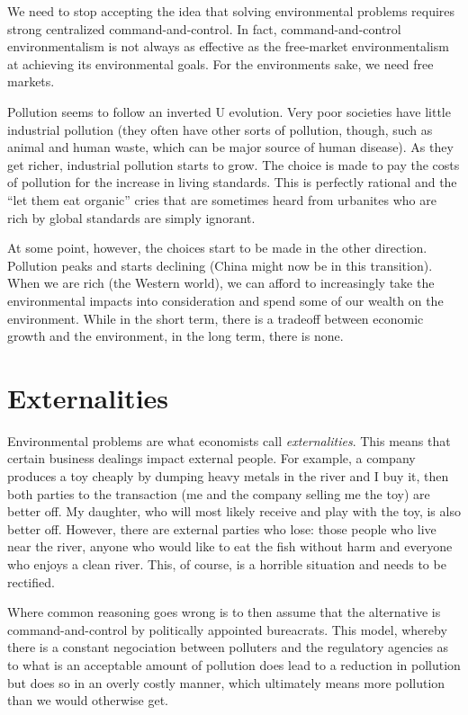 We need to stop accepting the idea that solving environmental problems requires
strong centralized command-and-control. In fact, command-and-control
environmentalism is not always as effective as the free-market environmentalism
at achieving its environmental goals. For the environments sake, we need free
markets.

Pollution seems to follow an inverted U evolution. Very poor societies have
little industrial pollution (they often have other sorts of pollution, though,
such as animal and human waste, which can be major source of human disease). As
they get richer, industrial pollution starts to grow. The choice is made to pay
the costs of pollution for the increase in living standards. This is perfectly
rational and the ``let them eat organic'' cries that are sometimes heard from
urbanites who are rich by global standards are simply ignorant.

At some point, however, the choices start to be made in the other direction.
Pollution peaks and starts declining (China might now be in this transition).
When we are rich (the Western world), we can afford to increasingly take the
environmental impacts into consideration and spend some of our wealth on the
environment.  While in the short term, there is a tradeoff between economic
growth and the environment, in the long term, there is none.

\section{Externalities}

Environmental problems are what economists call \emph{externalities}. This
means that certain business dealings impact external people. For example, a
company produces a toy cheaply by dumping heavy metals in the river and I buy
it, then both parties to the transaction (me and the company selling me the
toy) are better off. My daughter, who will most likely receive and play with
the toy, is also better off. However, there are external parties who lose:
those people who live near the river, anyone who would like to eat the fish
without harm and everyone who enjoys a clean river. This, of course, is a
horrible situation and needs to be rectified.

Where common reasoning goes wrong is to then assume that the alternative is
command-and-control by politically appointed bureacrats. This model, whereby
there is a constant negociation between polluters and the regulatory agencies
as to what is an acceptable amount of pollution does lead to a reduction in
pollution but does so in an overly costly manner, which ultimately means more
pollution than we would otherwise get.

